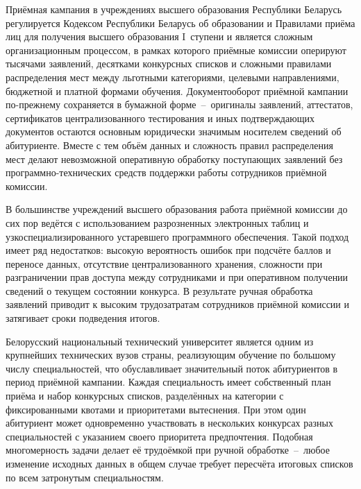 
Приёмная кампания в учреждениях высшего образования Республики Беларусь регулируется Кодексом Республики Беларусь об образовании  и Правилами приёма лиц для получения высшего образования I~ступени  и является сложным организационным процессом, в рамках которого приёмные комиссии оперируют тысячами заявлений, десятками конкурсных списков и сложными правилами распределения мест между льготными категориями, целевыми направлениями, бюджетной и платной формами обучения.
Документооборот приёмной кампании по-прежнему сохраняется в бумажной форме~--~оригиналы заявлений, аттестатов, сертификатов централизованного тестирования и иных подтверждающих документов остаются основным юридически значимым носителем сведений об абитуриенте.
Вместе с тем объём данных и сложность правил распределения мест делают невозможной оперативную обработку поступающих заявлений без программно-технических средств поддержки работы сотрудников приёмной комиссии.

В большинстве учреждений высшего образования работа приёмной комиссии до сих пор ведётся с использованием разрозненных электронных таблиц и узкоспециализированного устаревшего программного обеспечения.
Такой подход имеет ряд недостатков: высокую вероятность ошибок при подсчёте баллов и переносе данных, отсутствие централизованного хранения, сложности при разграничении прав доступа между сотрудниками и при оперативном получении сведений о текущем состоянии конкурса.
В результате ручная обработка заявлений приводит к высоким трудозатратам сотрудников приёмной комиссии и затягивает сроки подведения итогов.

Белорусский национальный технический университет является одним из крупнейших технических вузов страны, реализующим обучение по большому числу специальностей, что обуславливает значительный поток абитуриентов в период приёмной кампании.
Каждая специальность имеет собственный план приёма и набор конкурсных списков, разделённых на категории с фиксированными квотами и приоритетами вытеснения.
При этом один абитуриент может одновременно участвовать в нескольких конкурсах разных специальностей с указанием своего приоритета предпочтения.
Подобная многомерность задачи делает её трудоёмкой при ручной обработке~--~любое изменение исходных данных в общем случае требует пересчёта итоговых списков по всем затронутым специальностям.

